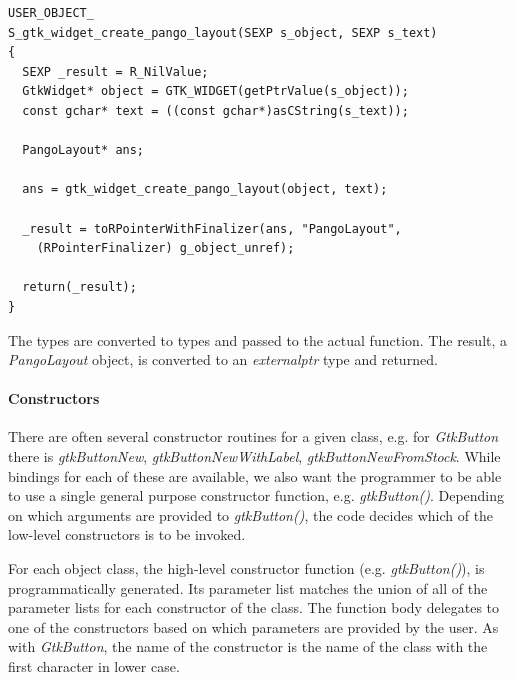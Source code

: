\documentclass[article]{jss}
\begin{document}
\begin{verbatim}
USER_OBJECT_
S_gtk_widget_create_pango_layout(SEXP s_object, SEXP s_text)
{
  SEXP _result = R_NilValue;
  GtkWidget* object = GTK_WIDGET(getPtrValue(s_object));
  const gchar* text = ((const gchar*)asCString(s_text));

  PangoLayout* ans;

  ans = gtk_widget_create_pango_layout(object, text);

  _result = toRPointerWithFinalizer(ans, "PangoLayout", 
    (RPointerFinalizer) g_object_unref);

  return(_result);
}
\end{verbatim}
The  types are converted to  types and passed
to
the actual  function. The result, a \emph{PangoLayout}
object, is
converted to an  \emph{externalptr} type and returned.

\paragraph{Constructors}

There are often several constructor routines for a given 
class, e.g. for \emph{GtkButton} there is \emph{gtkButtonNew}, \emph{gtkButtonNewWithLabel}, \emph{gtkButtonNewFromStock}. While bindings for each of these are available, we also want the  programmer to be able to use a single general purpose constructor function, e.g. \emph{gtkButton()}. Depending on which arguments are provided to \emph{gtkButton()}, the code decides which of the low-level constructors is to be invoked.

For each object class, the high-level constructor function (e.g. \emph{gtkButton()}), is programmatically generated. Its parameter list
matches the union of all of the parameter lists for each constructor of the class. The function body delegates to one of the constructors based on which parameters are provided by the user. As with \emph{GtkButton}, the name of the constructor is the name
of the class with the first character in lower case. 
\end{document}
